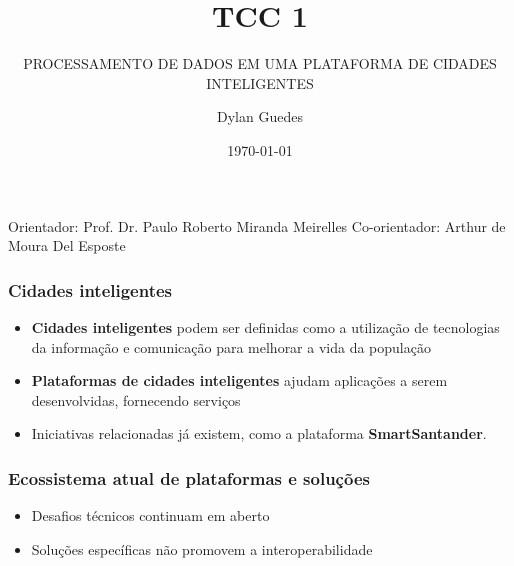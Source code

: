 \documentclass{beamer}
\title{TCC 1}
\subtitle{PROCESSAMENTO DE DADOS EM UMA PLATAFORMA DE CIDADES INTELIGENTES}
\author{Dylan Guedes}
\institute{UnB Gama}
\date{\today}
\begin{document}
    \begin{frame}
        \titlepage
        Orientador: Prof. Dr. Paulo Roberto Miranda Meirelles
        Co-orientador: Arthur de Moura Del Esposte
    \end{frame}

    \begin{frame}
        \frametitle{Cidades inteligentes}

        \begin{itemize}
            \item \textbf{Cidades inteligentes} podem ser definidas como a
                utilização de tecnologias da informação e comunicação para
                melhorar a vida da população

            \item \textbf{Plataformas de cidades inteligentes} ajudam aplicações
                a serem desenvolvidas, fornecendo serviços

            \item Iniciativas relacionadas já existem, como a plataforma
                \textbf{SmartSantander}.

        \end{itemize}
    \end{frame}

    \begin{frame}
        \frametitle{Ecossistema atual de plataformas e soluções}
        \begin{itemize}
            \item Desafios técnicos continuam em aberto
            \item Soluções específicas não promovem a interoperabilidade
        \end{itemize}
    \end{frame}
\end{document}
